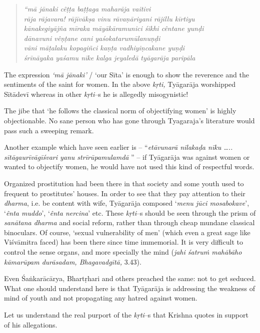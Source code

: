 \begin{verse}
\textit{“mā jānaki cêṭṭa baṭṭaga maharāja vaitivi}\\\textit{rāja rājavara! rājīvākṣa vinu rāvaṇāriyani rājillu kīrtiyu}\\\textit{kānakegiyājña mīraka māyākāramunici śikhi cêntane yunḍi}\\\textit{dānavuni vêṇṭane cani yaśokatarumūlanuṇḍi}\\\textit{vāni māṭalaku kopagiñci kaṇṭa vadhiyiṇcakane yuṇḍi} \\\textit{śrīnāyaka yaśamu nīke kalga jeyaledā tyāgarāja paripāla}
\end{verse}

The expression \textit{‘mā jānaki’} / ‘our Sīta’ is enough to show the reverence and the sentiments of the saint for women. In the above \textit{kṛti,} Tyāgarāja worshipped Sītādevī whereas in other \textit{kṛti}–s he is allegedly misogynistic! 

The jibe that ‘he follows the classical norm of objectifying women’ is highly objectionable. No sane person who has gone through Tyagaraja’s literature would pass such a sweeping remark. 

Another example which have seen earlier is – “\textit{etāvunarā nilakaḍa nīku ….. sītāgaurīvāgīśvari yanu strīrūpamulamdā} ” – if Tyāgarāja was against women or wanted to objectify women, he would have not used this kind of respectful words.

Organized prostitution had been there in that society and some youth used to frequent to prostitutes’ houses. In order to see that they pay attention to their \textit{dharma}, i.e. be content with wife, Tyāgarāja composed ‘\textit{menu jūci mosabokave}’, ‘\textit{ênta muddo}’, ‘\textit{ênta nercina}’ etc. These \textit{kṛti}–s should be seen through the prism of \textit{sanātana dharma} and social reform, rather than through cheap mundane classical binoculars. Of course, ‘sexual vulnerability of men’ (which even a great sage like Viśvāmitra faced) has been there since time immemorial. It is very difficult to control the sense organs, and more specially the mind (\textit{jahi śatruṁ mahābāho kāmarūpam durāsadam, Bhagavadgītā,} 3.43).

Even Śaṅkarācārya, Bhartṛhari and others preached the same: not to get seduced. What one should understand here is that Tyāgarāja is addressing the weakness of mind of youth and not propagating any hatred against women.

Let us understand the real purport of the \textit{kṛti}–s that Krishna quotes in support of his allegations.

